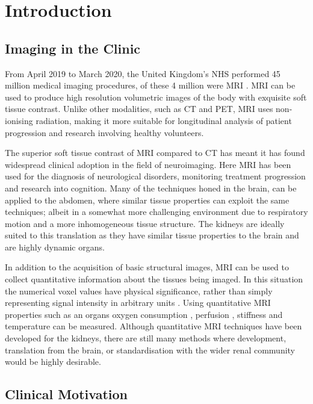 \chapter{Introduction}
\label{chap:intro}

\section{Imaging in the Clinic}
\label{sec:intro_imaging}
From April 2019 to March 2020, the United Kingdom's \ac{NHS} performed 45 million medical imaging procedures, of these 4 million were \ac{MRI} \cite{noauthor_diagnostic_2020}. \ac{MRI} can be used to produce high resolution volumetric images of the body with exquisite soft tissue contrast. Unlike other modalities, such as \ac{CT} and \ac{PET}, \ac{MRI} uses non-ionising radiation, making it more suitable for longitudinal analysis of patient progression and research involving healthy volunteers.

The superior soft tissue contrast of \ac{MRI} compared to \ac{CT} has meant it has found widespread clinical adoption in the field of neuroimaging. Here \ac{MRI} has been used for the diagnosis of neurological disorders, monitoring treatment progression and research into cognition. Many of the techniques honed in the brain, can be applied to the abdomen, where similar tissue properties can exploit the same techniques; albeit in a somewhat more challenging environment due to respiratory motion and a more inhomogeneous tissue structure. The kidneys are ideally suited to this translation as they have similar tissue properties to the brain and are highly dynamic organs.

In addition to the acquisition of basic structural images, \ac{MRI} can be used to collect quantitative information about the tissues being imaged. In this situation the numerical voxel values have physical significance, rather than simply representing signal intensity in arbitrary units \cite{tofts_quantitative_2003}. Using quantitative \ac{MRI} properties such as an organs oxygen consumption \cite{zhang_quantitative_2015}, perfusion \cite{karger_quantitation_2000}, stiffness \cite{mariappan_magnetic_2010} and temperature \cite{yuan_towards_2012} can be measured. Although quantitative \ac{MRI} techniques have been developed for the kidneys, there are still many methods where development, translation from the brain, or standardisation with the wider renal community would be highly desirable.

\section{Clinical Motivation}
\label{sec:intro_clinical}

